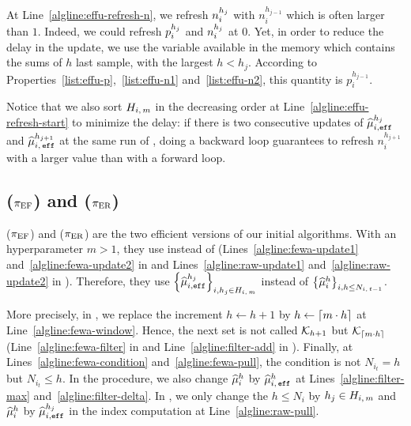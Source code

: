 \begin{remark}
At Line~\ref{algline:effu-refresh-n}, we refresh $n_i^{h_j}$ with $n_i^{h_{j-1}}$ which is often larger than $1$. Indeed, we could refresh $p_i^{h_j}$ and $n_i^{h_j}$ at $0$. Yet, in order to reduce the delay in the update, we use the variable available in the memory which contains the sums of $h$ last sample, with the largest $h< h_j$. According to Properties~\ref{list:effu-p},~\ref{list:effu-n1} and~\ref{list:effu-n2}, this quantity is $p_i^{h_{j-1}}$. 

Notice that we also sort $H_{i,\,m}$ in the decreasing order at Line~\ref{algline:effu-refresh-start} to minimize the delay: if there is two consecutive updates of $\widehat{\mu}_{i,\texttt{eff}}^{h_j}$ and $\widehat{\mu}_{i,\, \texttt{eff}}^{h_{j+1}}$ at the same run of \EFF, doing a backward loop guarantees to refresh $n_i^{h_{j+1}}$ with a larger value than with a forward loop. 
\end{remark}


\subsection{{\EFFFEWA} ($\normalfont \pi_{\rm EF}$) and {\EFFRAW} ($\normalfont \pi_{\rm ER}$)}
{\EFFFEWA} ($\normalfont \pi_{\rm EF}$) and {\EFFRAW} ($\normalfont \pi_{\rm ER}$) are the two efficient versions of our initial algorithms. With an hyperparameter $m>1$, they use \EFF instead of \UPDATE (Lines~\ref{algline:fewa-update1} and~\ref{algline:fewa-update2} in \FEWA and Lines~\ref{algline:raw-update1} and~\ref{algline:raw-update2} in \RUCB). Therefore, they use $\left\{\widehat{\mu}_{i,\texttt{eff}}^{h_j}\right\}_{i,h_j\in H_{i,\,m}}$ instead of $\left\{\widehat{\mu}_i^h\right\}_{i,h \leq N_{i,\,t-1}}$. 

More precisely, in \FEWA, we replace the increment $h\gets h+1$ by $h\gets\left\lceil m\cdot h\right\rceil$ at Line~\ref{algline:fewa-window}. Hence, the next set is not called $\mathcal{K}_{h+1}$ but $\mathcal{K}_{\left\lceil m\cdot h\right\rceil}$ (Line~\ref{algline:fewa-filter} in \FEWA and Line~\ref{algline:filter-add} in \FILTER). Finally, at Lines~\ref{algline:fewa-condition} and~\ref{algline:fewa-pull}, the condition is not $N_{i_t}=h$ but $N_{i_t} \leq h$. In the \FILTER procedure, we also change $\widehat{\mu}_i^h$ by $\widehat{\mu}_{i,\,\texttt{eff}}^h$ at Lines~\ref{algline:filter-max} and~\ref{algline:filter-delta}. In \RUCB, we only change the $h\leq N_i$ by $h_j \in H_{i,\,m}$ and $\widehat{\mu}_i^h$ by $\widehat{\mu}_{i,\texttt{eff}}^{h_j}$ in the index computation at Line~\ref{algline:raw-pull}.

